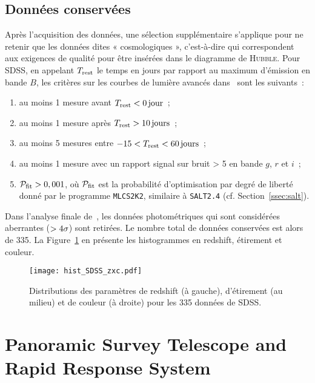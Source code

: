 \documentclass[../main/main.tex]{subfiles}
\begin{document}
\subsection{Données conservées}\label{ssec:sdssdata}

Après l'acquisition des données, une sélection supplémentaire s'applique pour ne
retenir que les données dites « cosmologiques », c'est-à-dire qui correspondent
aux exigences de qualité pour être insérées dans le diagramme de
\textsc{Hubble}. Pour SDSS, en appelant $T_{\rm rest}$ le temps en jours par
rapport au maximum d'émission en bande $B$, les critères sur les courbes de
lumière avancés dans~\cite{kessler2009b} sont les suivants~:

\begin{enumerate}
    \item au moins 1 mesure avant $T_{\rm rest} < \SI{0}{jour}$~;
    \item au moins 1 mesure après $T_{\rm rest} > \SI{10}{jours}$~;
    \item au moins 5 mesures entre $-15 < T_{\rm rest} < \SI{60}{jours}$~;
    \item au moins 1 mesure avec un rapport signal sur bruit > 5 en bande $g$,
        $r$ et $i$~;
    \item $\mathcal{P}_{\rm fit} > 0,001$, où $\mathcal{P}_{\rm fit}$ est la
        probabilité d'optimisation par degré de liberté donné par le programme
        \texttt{MLCS2K2}, similaire à \texttt{SALT2.4} (cf.
        Section~\ref{ssec:salt}).
\end{enumerate}
Dans l'analyse finale de~\cite{scolnic2018}, les données photométriques qui sont
considérées aberrantes ($>4\sigma$) sont retirées. Le nombre total de données
conservées est alors de 335. La Figure~\ref{fig:sdsshist} en présente les
histogrammes en redshift, étirement et couleur.

\begin{figure}[ht]
    \centering
    \texttt{[image: hist\_SDSS\_zxc.pdf]}
    \caption[Distributions des paramètres de redshift, étirement et couleur de
    SDSS]{Distributions des paramètres de redshift (à gauche), d'étirement (au
    milieu) et de couleur (à droite) pour les 335 données de SDSS.}
    \label{fig:sdsshist}
\end{figure}

\section{Panoramic Survey Telescope and Rapid Response
System}\label{sec:ps1}
\end{document}
